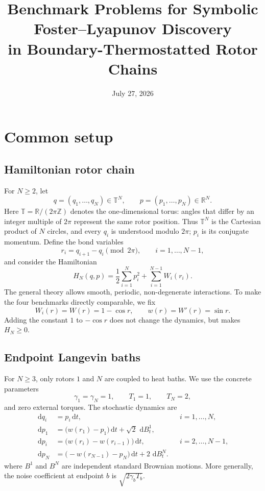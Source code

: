 \documentclass[11pt]{article}
\title{Benchmark Problems for Symbolic Foster--Lyapunov Discovery\\
       in Boundary-Thermostatted Rotor Chains}
\date{July 27, 2026}
\newcommand{\T}{\mathbb{T}}
\newcommand{\R}{\mathbb{R}}
\newcommand{\1}{\mathbf{1}}
\newcommand{\dd}{\,\mathrm{d}}
\begin{document}
\maketitle

\section{Common setup}

\subsection{Hamiltonian rotor chain}
For $N\ge 2$, let
\[
q=(q_1,\ldots,q_N)\in\T^N,
\qquad
p=(p_1,\ldots,p_N)\in\R^N.
\]
Here $\T=\R/(2\pi\mathbb Z)$ denotes the one-dimensional torus: angles that differ by an integer multiple of $2\pi$ represent the same rotor position. Thus $\T^N$ is the Cartesian product of $N$ circles, and every $q_i$ is understood modulo $2\pi$; $p_i$ is its conjugate momentum. Define the bond variables
\[
r_i=q_{i+1}-q_i\pmod{2\pi},
\qquad i=1,\ldots,N-1,
\]
and consider the Hamiltonian
\begin{equation}
H_N(q,p)=\frac12\sum_{i=1}^{N}p_i^2+\sum_{i=1}^{N-1}W_i(r_i).
\end{equation}
The general theory allows smooth, periodic, non-degenerate interactions. To make the four benchmarks directly comparable, we fix
\begin{equation}
W_i(r)=W(r)=1-\cos r,
\qquad
w(r)=W'(r)=\sin r.
\end{equation}
Adding the constant $1$ to $-\cos r$ does not change the dynamics, but makes $H_N\ge0$.

\subsection{Endpoint Langevin baths}
For $N\ge3$, only rotors $1$ and $N$ are coupled to heat baths. We use the concrete parameters
\begin{equation}
\gamma_1=\gamma_N=1,
\qquad T_1=1,
\qquad T_N=2,
\end{equation}
and zero external torques. The stochastic dynamics are
\begin{subequations}
\begin{align}
\dd q_i &=p_i\dd t, &&i=1,\ldots,N,\\
\dd p_1&=\bigl(w(r_1)-p_1\bigr)\dd t+\sqrt2\,\dd B_t^1,\\
\dd p_i&=\bigl(w(r_i)-w(r_{i-1})\bigr)\dd t,
&&i=2,\ldots,N-1,\\
\dd p_N&=\bigl(-w(r_{N-1})-p_N\bigr)\dd t+2\,\dd B_t^N.
\end{align}
\end{subequations}
where $B^1$ and $B^N$ are independent standard Brownian motions. More generally, the noise coefficient at endpoint $b$ is $\sqrt{2\gamma_bT_b}$.
\end{document}
